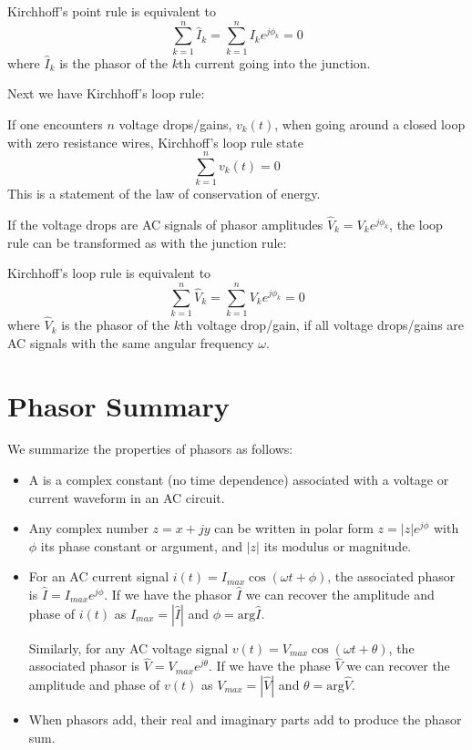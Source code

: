 \documentclass[12pt, a4paper, oneside, openright, titlepage]{book}
\begin{document}
\begin{thm}
    Kirchhoff's point rule is equivalent to $$\sum_{k=1}^n\hat{I}_k = \sum_{k=1}^nI_ke^{j\phi_k} = 0$$ where $\hat{I}_k$ is the phasor of the $k$th current going into the junction.
\end{thm}

\noindent Next we have Kirchhoff's loop rule:

\begin{thm}
    If one encounters $n$ voltage drops/gains, $v_k(t)$, when going around a closed loop with zero resistance wires, Kirchhoff's loop rule state $$\sum_{k=1}^nv_k(t) = 0$$ This is a statement of the law of conservation of energy.
\end{thm}

If the voltage drops are AC signals of phasor amplitudes $\hat{V}_k = V_ke^{j\phi_k}$, the loop rule can be transformed as with the junction rule:

\begin{thm}
    Kirchhoff's loop rule is equivalent to $$\sum_{k=1}^n\hat{V}_k = \sum_{k=1}^nV_ke^{j\phi_k} = 0$$ where $\hat{V}_k$ is the phasor of the $k$th voltage drop/gain, if all voltage drops/gains are AC signals with the same angular frequency $\omega$.
\end{thm}

\section{Phasor Summary}

We summarize the properties of phasors as follows: 

\begin{itemize}
    \item A  is a complex constant (no time dependence) associated with a voltage or current waveform in an AC circuit.
    \item Any complex number $z = x+jy$ can be written in polar form $z = |z|e^{j\phi}$ with $\phi$ its phase constant or argument, and $|z|$ its modulus or magnitude.
    \item For an AC current signal $i(t) = I_{max}\cos(\omega t+\phi)$, the associated phasor is $\hat{I} = I_{max}e^{j\phi}$. If we have the phasor $\hat{I}$ we can recover the amplitude and phase of $i(t)$ as $I_{max} = |\hat{I}|$ and $\phi = \text{arg}\hat{I}$.

        Similarly, for any AC voltage signal $v(t) = V_{max}\cos(\omega t+\theta)$, the associated phasor is $\hat{V} = V_{max}e^{j\theta}$. If we have the phase $\hat{V}$ we can recover the amplitude and phase of $v(t)$ as $V_{max} = |\hat{V}|$ and $\theta = \text{arg}\hat{V}$.
    \item When phasors add, their real and imaginary parts add to produce the phasor sum.
\end{itemize}
\end{document}
